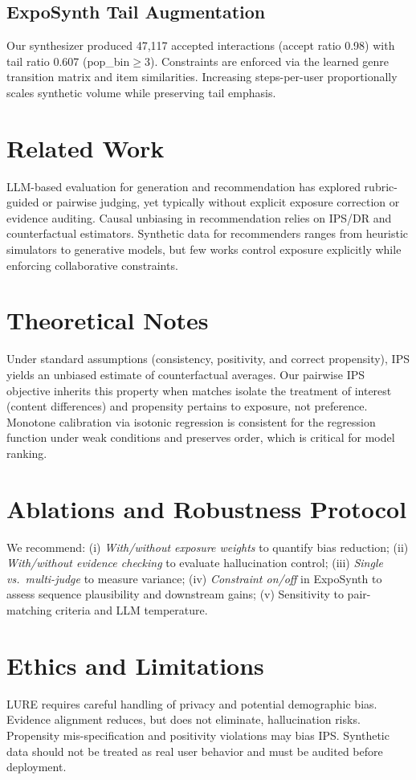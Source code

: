 \documentclass[sigconf,anonymous,review]{acmart}
\begin{document}
\subsection{ExpoSynth Tail Augmentation}
Our synthesizer produced 47,117 accepted interactions (accept ratio 0.98) with tail ratio 0.607 (pop\_bin\(\ge\)3). Constraints are enforced via the learned genre transition matrix and item similarities. Increasing steps-per-user proportionally scales synthetic volume while preserving tail emphasis.

\section{Related Work}
LLM-based evaluation for generation and recommendation has explored rubric-guided or pairwise judging, yet typically without explicit exposure correction or evidence auditing. Causal unbiasing in recommendation relies on IPS/DR and counterfactual estimators. Synthetic data for recommenders ranges from heuristic simulators to generative models, but few works control exposure explicitly while enforcing collaborative constraints.

\section{Theoretical Notes}
Under standard assumptions (consistency, positivity, and correct propensity), IPS yields an unbiased estimate of counterfactual averages. Our pairwise IPS objective inherits this property when matches isolate the treatment of interest (content differences) and propensity pertains to exposure, not preference. Monotone calibration via isotonic regression is consistent for the regression function under weak conditions and preserves order, which is critical for model ranking.

\section{Ablations and Robustness Protocol}
We recommend: (i) \emph{With/without exposure weights} to quantify bias reduction; (ii) \emph{With/without evidence checking} to evaluate hallucination control; (iii) \emph{Single vs.~multi-judge} to measure variance; (iv) \emph{Constraint on/off} in ExpoSynth to assess sequence plausibility and downstream gains; (v) Sensitivity to pair-matching criteria and LLM temperature.

\section{Ethics and Limitations}
LURE requires careful handling of privacy and potential demographic bias. Evidence alignment reduces, but does not eliminate, hallucination risks. Propensity mis-specification and positivity violations may bias IPS. Synthetic data should not be treated as real user behavior and must be audited before deployment.
\end{document}
